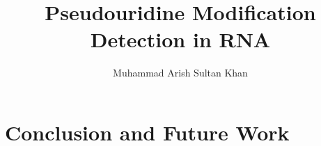 \documentclass[12pt]{book}
\begin{document}
  \title{Pseudouridine Modification Detection in RNA}
  \author{Muhammad Arish Sultan Khan}

  \maketitle

  \tableofcontents
  \newpage


  
  
  
  


  \chapter{Conclusion and Future Work}
    \label{ch:conclusion}

    
\end{document}
